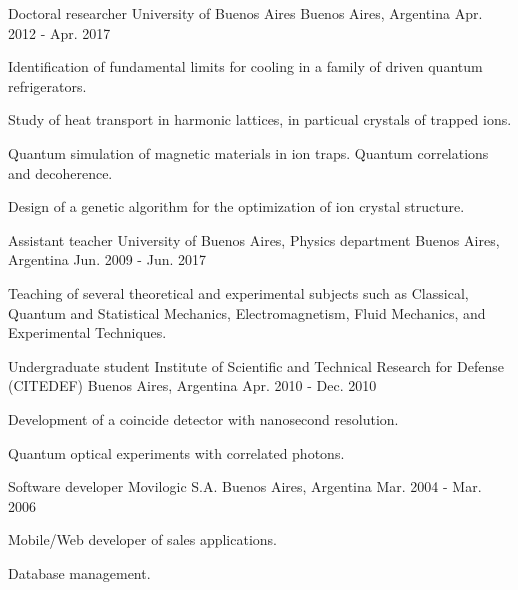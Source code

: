 \begin{cventries}
  \cventry
    {Doctoral researcher} %
    {University of Buenos Aires} %
    {Buenos Aires, Argentina} %
    {Apr. 2012 - Apr. 2017} %
    {
      \begin{cvitems} %
        \item Identification of fundamental limits for cooling in a family of driven quantum refrigerators.
        \item Study of heat transport in harmonic lattices, in particual crystals of trapped ions.
        \item Quantum simulation of magnetic materials in ion traps. Quantum correlations and decoherence.
        \item Design of a genetic algorithm for the optimization of ion crystal structure.
      \end{cvitems}
    }

  \cventry
    {Assistant teacher} %
    {University of Buenos Aires, Physics department} %
    {Buenos Aires, Argentina} %
    {Jun. 2009 - Jun. 2017} %
    {
      \begin{cvitems} %
        \item Teaching of several theoretical and experimental subjects such as Classical, Quantum and Statistical Mechanics,
        Electromagnetism, Fluid Mechanics, and Experimental Techniques.
      \end{cvitems}
    }

  \cventry
    {Undergraduate student} %
    {Institute of Scientific and Technical Research for Defense (CITEDEF)} %
    {Buenos Aires, Argentina} %
    {Apr. 2010 - Dec. 2010} %
    {
      \begin{cvitems} %
        \item Development of a coincide detector with nanosecond resolution.
        \item Quantum optical experiments with correlated photons.
      \end{cvitems}
    }

  \cventry
    {Software developer} %
    {Movilogic S.A.} %
    {Buenos Aires, Argentina} %
    {Mar. 2004 - Mar. 2006} %
    {
      \begin{cvitems}
        \item Mobile/Web developer of sales applications.
        \item Database management.
      \end{cvitems}
    }



\end{cventries}

